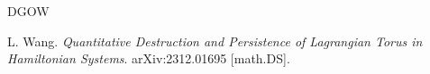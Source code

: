 \documentclass{amsart}
\newcounter{item}[section]
\theoremstyle{definition}
\begin{document}
\begin{thebibliography}{DGOW}
			
			
			
			 L. Wang. {\it Quantitative Destruction and Persistence of Lagrangian Torus in Hamiltonian Systems}. arXiv:2312.01695 [math.DS].
\end{thebibliography}
\end{document}
